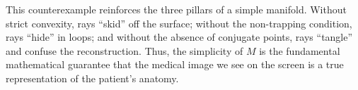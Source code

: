 This counterexample reinforces the three pillars of a simple manifold. Without strict convexity, rays ``skid'' off the surface; without the non-trapping condition, rays ``hide'' in loops; and without the absence of conjugate points, rays ``tangle'' and confuse the reconstruction. Thus, the simplicity of $M$ is the fundamental mathematical guarantee that the medical image we see on the screen is a true representation of the patient's anatomy.
